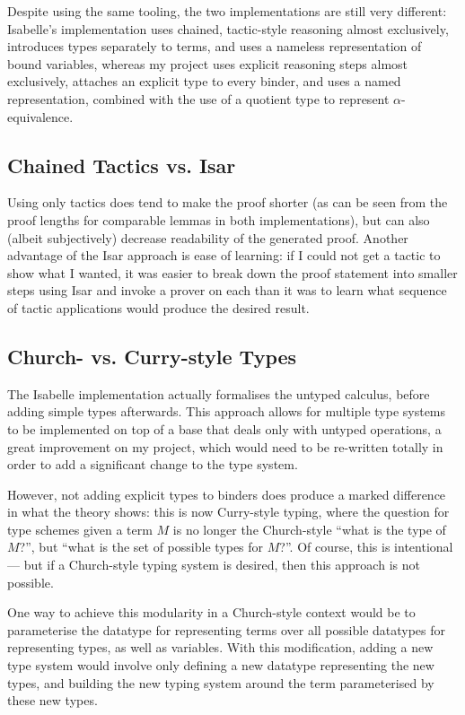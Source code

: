 Despite using the same tooling, the two implementations are still very different: Isabelle's implementation uses chained, tactic-style reasoning almost exclusively, introduces types separately to terms, and uses a nameless representation of bound variables, whereas my project uses explicit reasoning steps almost exclusively, attaches an explicit type to every binder, and uses a named representation, combined with the use of a quotient type to represent \(\alpha\)-equivalence.

\subsection{Chained Tactics vs. Isar}
Using only tactics does tend to make the proof shorter (as can be seen from the proof lengths for comparable lemmas in both implementations), but can also (albeit subjectively) decrease readability of the generated proof\cite{isar-phd}.
Another advantage of the Isar approach is ease of learning: if I could not get a tactic to show what I wanted, it was easier to break down the proof statement into smaller steps using Isar and invoke a prover on each than it was to learn what sequence of tactic applications would produce the desired result.

\subsection{Church- vs. Curry-style Types}
The Isabelle implementation actually formalises the untyped calculus, before adding simple types afterwards.
This approach allows for multiple type systems to be implemented on top of a base that deals only with untyped operations, a great improvement on my project, which would need to be re-written totally in order to add a significant change to the type system.

However, not adding explicit types to binders does produce a marked difference in what the theory shows: this is now Curry-style typing, where the question for type schemes given a term \(M\) is no longer the Church-style ``what is the type of \(M\)?'', but ``what is the set of possible types for \(M\)?''.
Of course, this is intentional --- but if a Church-style typing system is desired, then this approach is not possible.

One way to achieve this modularity in a Church-style context would be to parameterise the datatype for representing terms over all possible datatypes for representing types, as well as variables.
With this modification, adding a new type system would involve only defining a new datatype representing the new types, and building the new typing system around the term parameterised by these new types.

